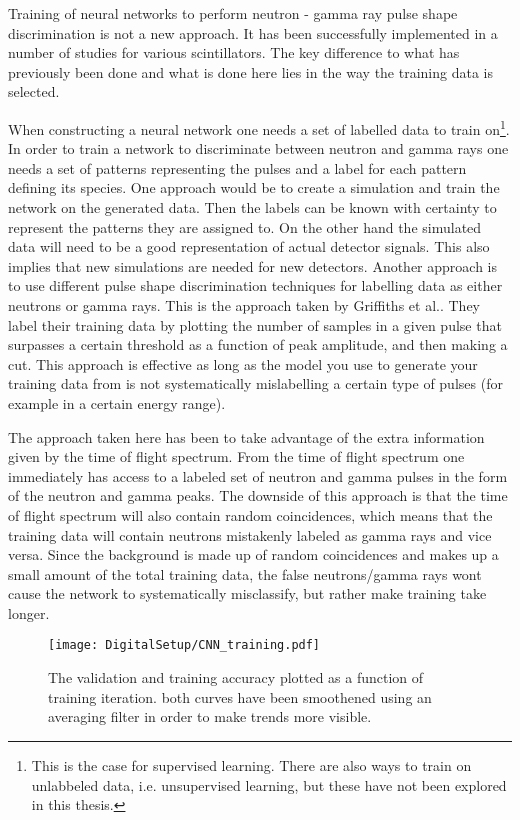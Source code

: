\documentclass[main.tex]{subfiles}
\begin{document}
Training of neural networks to perform neutron - gamma ray pulse shape discrimination is not a new approach. It has been successfully implemented in a number of studies for various scintillators. The key difference to what has previously been done and what is done here lies in the way the training data is selected.

When constructing a neural network one needs a set of labelled data to train on\footnote{This is the case for supervised learning. There are also ways to train on unlabbeled data, i.e. unsupervised learning, but these have not been explored in this thesis.}. In order to train a network to discriminate between neutron and gamma rays one needs a set of patterns representing the pulses and a label for each pattern defining its species. One approach would be to create a simulation and train the network on the generated data. Then the labels can be known with certainty to represent the patterns they are assigned to. On the other hand the simulated data will need to be a good representation of actual detector signals. This also implies that new simulations are needed for new detectors. Another approach is to use different pulse shape discrimination techniques for labelling data as either neutrons or gamma rays. This is the approach taken by  Griffiths et al.\cite{Griffiths}. They label their training data by plotting the number of samples in a given pulse that surpasses a certain threshold as a function of peak amplitude, and then making a cut. This approach is effective as long as the model you use to generate your training data from is not systematically mislabelling a certain type of pulses (for example in a certain energy range). 

The approach taken here has been to take advantage of the extra information given by the time of flight spectrum. From the time of flight spectrum one immediately has access to a labeled set of neutron and gamma pulses in the form of the neutron and gamma peaks. The downside of this approach is that the time of flight spectrum will also contain random coincidences, which means that the training data will contain neutrons mistakenly labeled as gamma rays and vice versa. Since the background is made up of random coincidences and makes up a small amount of the total training data, the false neutrons/gamma rays wont cause the network to systematically misclassify, but rather make training take longer.

\begin{figure}[ht!]
    \centering
        \texttt{[image: DigitalSetup/CNN\_training.pdf]}
        \caption[Training and validation accuracy of the CNN]{The validation and training accuracy plotted as a function of training iteration. both curves have been smoothened using an averaging filter in order to make trends more visible.}
    \label{fig:CNN_training} 
\end{figure}
\end{document}
